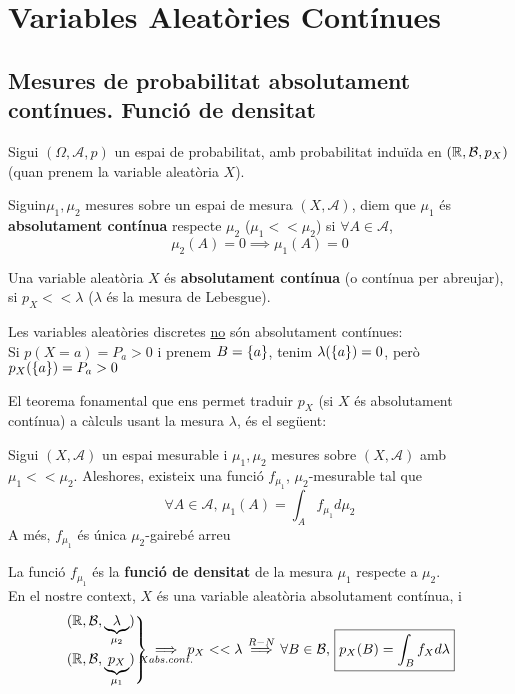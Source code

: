\section{Variables Aleatòries Contínues}
\subsection{Mesures de probabilitat absolutament contínues. Funció de densitat}
Sigui $(\Omega, \mathcal{A},p)$ un espai de probabilitat, amb probabilitat induïda en 
$(\mathbb{R}, \mathcal{B},p_{X})$ (quan prenem la variable aleatòria $X$).

\begin{defi}
  Siguin$\mu_{1},\mu_{2}$ mesures sobre un espai de mesura $(X,\mathcal{A})$, diem que 
  $\mu_{1}$ és \textbf{absolutament contínua} respecte $\mu_{2}$ ($\mu_{1}<<\mu_{2}$) si $\forall A\in \mathcal{A}$,
  \[
    \mu_{2}(A)=0 \implies \mu_{1}(A)=0
  \]
\end{defi}

\begin{defi}
  Una variable aleatòria $X$ és \textbf{absolutament contínua} (o contínua per abreujar), 
  si $p_{X}<<\lambda$ ($\lambda$ és la mesura de Lebesgue).
\end{defi}

\begin{obs}
  Les variables aleatòries discretes \underline{no} són absolutament contínues: \\
  Si $p(X=a)=P_{a}>0$ i prenem $B=\left\{a\right\}$, tenim $\lambda(\left\{a\right\})=0$, però $p_{X}(\left\{a\right\})=P_{a}>0$
\end{obs}

El teorema fonamental que ens permet traduir $p_{X}$ (si $X$ és absolutament contínua) a 
càlculs usant la mesura $\lambda$, és el següent:

\begin{thm}
  Sigui $(X,\mathcal{A})$ un espai mesurable i $\mu_{1},\mu_{2}$ mesures sobre $(X,\mathcal{A})$ 
  amb $\mu_{1}<<\mu_{2}$. Aleshores, existeix una funció $f_{\mu_{1}}$, $\mu_{2}$-mesurable tal que
  \[
    \forall A \in \mathcal{A}, \, \mu_{1}(A)=\int_{A}f_{\mu_{1}}d\mu_{2}
  \]
  A més, $f_{\mu_{1}}$ és única $\mu_{2}$-gairebé arreu
\end{thm}

\begin{defi}
  La funció $f_{\mu_{1}}$ és la \textbf{funció de densitat} de la mesura $\mu_{1}$ respecte a $\mu_{2}$. \\
  En el nostre context, $X$ és una variable aleatòria absolutament contínua, i
  \[
    \begin{rcases}
      (\real, \mathcal{B},\underbrace{\lambda}_{\mu_{2}})\\
      (\real, \mathcal{B}, \underbrace{p_{X}}_{\mu_{1}})
    \end{rcases}\underset{\mathclap{X abs. cont.}}{\implies} \, p_{X}<<\lambda\overset{R-N}{\implies} 
    \forall B \in \mathcal{B}, \, \boxed{p_{X}(B)=\int_{B}f_{X}d\lambda}
  \]
\end{defi}

